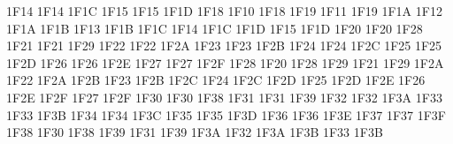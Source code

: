 \setcclcucx 1F14 1F14 1F1C %
\setcclcucx 1F15 1F15 1F1D %
\setcclcucx 1F18 1F10 1F18 %
\setcclcucx 1F19 1F11 1F19 %
\setcclcucx 1F1A 1F12 1F1A %
\setcclcucx 1F1B 1F13 1F1B %
\setcclcucx 1F1C 1F14 1F1C %
\setcclcucx 1F1D 1F15 1F1D %
\setcclcucx 1F20 1F20 1F28 %
\setcclcucx 1F21 1F21 1F29 %
\setcclcucx 1F22 1F22 1F2A %
\setcclcucx 1F23 1F23 1F2B %
\setcclcucx 1F24 1F24 1F2C %
\setcclcucx 1F25 1F25 1F2D %
\setcclcucx 1F26 1F26 1F2E %
\setcclcucx 1F27 1F27 1F2F %
\setcclcucx 1F28 1F20 1F28 %
\setcclcucx 1F29 1F21 1F29 %
\setcclcucx 1F2A 1F22 1F2A %
\setcclcucx 1F2B 1F23 1F2B %
\setcclcucx 1F2C 1F24 1F2C %
\setcclcucx 1F2D 1F25 1F2D %
\setcclcucx 1F2E 1F26 1F2E %
\setcclcucx 1F2F 1F27 1F2F %
\setcclcucx 1F30 1F30 1F38 %
\setcclcucx 1F31 1F31 1F39 %
\setcclcucx 1F32 1F32 1F3A %
\setcclcucx 1F33 1F33 1F3B %
\setcclcucx 1F34 1F34 1F3C %
\setcclcucx 1F35 1F35 1F3D %
\setcclcucx 1F36 1F36 1F3E %
\setcclcucx 1F37 1F37 1F3F %
\setcclcucx 1F38 1F30 1F38 %
\setcclcucx 1F39 1F31 1F39 %
\setcclcucx 1F3A 1F32 1F3A %
\setcclcucx 1F3B 1F33 1F3B %
